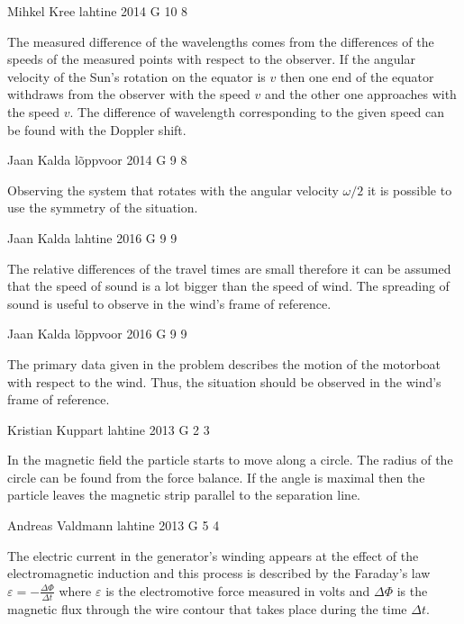 \documentclass[11pt]{article}
\begin{document}
{Mihkel Kree} %
{lahtine} %
{2014} %
{G 10} %
{8} %
{

\ifEngHint
The measured difference of the wavelengths comes from the differences of the speeds of the measured points with respect to the observer. If the angular velocity of the Sun’s rotation on the equator is $v$ then one end of the equator withdraws from the observer with the speed $v$ and the other one approaches with the speed $v$. The difference of wavelength corresponding to the given speed can be found with the Doppler shift.
\fi
}

{Jaan Kalda} %
{lõppvoor} %
{2014} %
{G 9} %
{8} %
{

\ifEngHint
Observing the system that rotates with the angular velocity $\omega/2$ it is possible to use the symmetry of the situation.
\fi
}

{Jaan Kalda} %
{lahtine} %
{2016} %
{G 9} %
{9} %
{

\ifEngHint
The relative differences of the travel times are small therefore it can be assumed that the speed of sound is a lot bigger than the speed of wind. The spreading of sound is useful to observe in the wind’s frame of reference.
\fi
}

{Jaan Kalda} %
{lõppvoor} %
{2016} %
{G 9} %
{9} %
{

\ifEngHint
The primary data given in the problem describes the motion of the motorboat with respect to the wind. Thus, the situation should be observed in the wind’s frame of reference.
\fi
}

{Kristian Kuppart} %
{lahtine} %
{2013} %
{G 2} %
{3} %
{

\ifEngHint
In the magnetic field the particle starts to move along a circle. The radius of the circle can be found from the force balance. If the angle is maximal then the particle leaves the magnetic strip parallel to the separation line.
\fi
}

{Andreas Valdmann} %
{lahtine} %
{2013} %
{G 5} %
{4} %
{

\ifEngHint
The electric current in the generator’s winding appears at the effect of the electromagnetic induction and this process is described by the Faraday’s law $\varepsilon = -\frac{\Delta\Phi}{\Delta t}$ where $\varepsilon$ is the electromotive force measured in volts and $\Delta\Phi$ is the magnetic flux through the wire contour that takes place during the time $\Delta t$.
\fi
}
\end{document}
